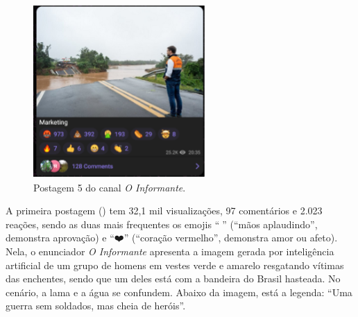 \documentclass[portuguese]{textolivre}
\begin{document}
\begin{figure}[h!]
    \vspace{0.2cm} %
    
    \begin{minipage}[t]{0.39\textwidth}
        \centering
        \includegraphics[width=\linewidth]{Imagens/Fig17.png}
        \caption{Postagem 5 do canal \emph{O Informante}.}
        \label{fig-17}
    \end{minipage}
    
\end{figure}



A primeira postagem () tem 32,1 mil visualizações, 97 comentários e 2.023 reações, sendo as duas mais frequentes os emojis ``{\Symbola 👏}'' (``mãos aplaudindo'', demonstra aprovação) e ``{\Symbola ❤️}'' (``coração vermelho'', demonstra amor ou afeto). Nela, o enunciador \emph{O Informante} apresenta a imagem gerada por inteligência artificial de um grupo de homens em vestes verde e amarelo resgatando vítimas das enchentes, sendo que um deles está com a bandeira do Brasil hasteada. No cenário, a lama e a água se confundem. Abaixo da imagem, está a legenda: ``Uma guerra sem soldados, mas cheia de heróis''.
\end{document}
